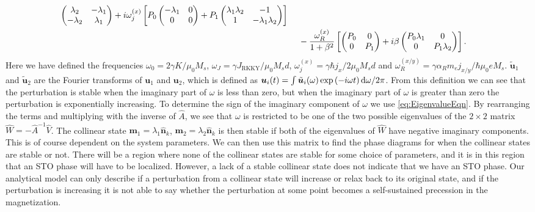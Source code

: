 \begin{subequations}
\begin{align}
\begin{pmatrix}
     \lambda_2 & -\lambda_1 \\
     -\lambda_2 & \lambda_1
    \end{pmatrix}
    + i\omega_j^{(x)}\left[P_0
    \begin{pmatrix}
     -\lambda_1 & 0 \\
     0 & 0
    \end{pmatrix}
    + P_1
    \begin{pmatrix}
     \lambda_1\lambda_2 & -1 \\
     1 & -\lambda_1\lambda_2
    \end{pmatrix}\right] \\
    &\hspace{4.5mm} -\frac{\omega_R^{(x)}}{1+\beta^2}\left[
    \begin{pmatrix}
     P_0 & 0 \\
     0 & P_1
    \end{pmatrix}
    + i \beta
    \begin{pmatrix}
     P_0\lambda_1 & 0 \\
     0 & P_1\lambda_2
    \end{pmatrix}\right]. \label{eq:Vfilm}
\end{align}
\end{subequations}
Here we have defined the frequencies $\omega_0 = 2\gamma K/\mu_0M_s$, $\omega_J = \gamma J_{\text{RKKY}}/\mu_0 M_s d$, $\omega_j^{(x)} = \gamma \hbar j_x/2\mu_0M_sd$ and $\omega_R^{(x/y)} = \gamma \alpha_R m_e j_{x/y}/\hbar\mu_0 e M_s$. $\tilde{\mathbold{u}}_1$ and $\tilde{\mathbold{u}}_2$ are the Fourier transforms of $\mathbold{u}_1$ and $\mathbold{u}_2$, which is defined as $\mathbold{u}_i(t) = \int \tilde{\mathbold{u}}_i(\omega) \exp\left(-i\omega t\right) \d \omega/{2\pi}$. From this definition we can see that the perturbation is stable when the imaginary part of $\omega$ is less than zero, but when the imaginary part of $\omega$ is greater than zero the perturbation is exponentially increasing. To determine the sign of the imaginary component of $\omega$ we use \eqref{eq:EigenvalueEqn}. By rearranging the terms and multiplying with the inverse of $\hat{A}$, we see that $\omega$ is restricted to be one of the two possible eigenvalues of the $2\times2$ matrix $\hat{W} = -\hat{A}^{-1}\hat{V}$. The collinear state $\mathbold{m}_1=\lambda_1\mathbold{\hat{n}}_k$, $\mathbold{m}_2=\lambda_2\mathbold{\hat{n}}_k$ is then stable if both of the eigenvalues of $\hat{W}$ have negative imaginary components. This is of course dependent on the system parameters. We can then use this matrix to find the phase diagrams for when the collinear states are stable or not. There will be a region where none of the collinear states are stable for some choice of parameters, and it is in this region that an STO phase will have to be localized. However, a lack of a stable collinear state does not indicate that we have an STO phase. Our analytical model can only describe if a perturbation from a collinear state will increase or relax back to its original state, and if the perturbation is increasing it is not able to say whether the perturbation at some point becomes a self-sustained precession in the magnetization. 

